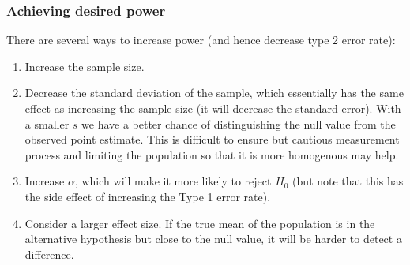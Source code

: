 \documentclass[slidestop,compress,mathserif]{beamer}
\begin{document}

\begin{frame}
\frametitle{Achieving desired power}

There are several ways to increase power (and hence decrease type 2 error rate):

\pause

{\small
\begin{enumerate}

\item Increase the sample size.

\pause

\item Decrease the standard deviation of the sample, which essentially has the same effect as increasing the sample size (it will decrease the standard error). With a smaller $s$ we have a better chance of distinguishing the null value from the observed point estimate. This is difficult to ensure but cautious measurement process and limiting the population so that it is more homogenous may help.

\pause

\item Increase $\alpha$, which will make it more likely to reject $H_0$ (but note that this has the side effect of increasing the Type 1 error rate).

\pause

\item Consider a larger effect size. If the true mean of the population is in the alternative hypothesis but close to the null value, it will be harder to detect a difference.

\end{enumerate}
}

\end{frame}


\end{document}
